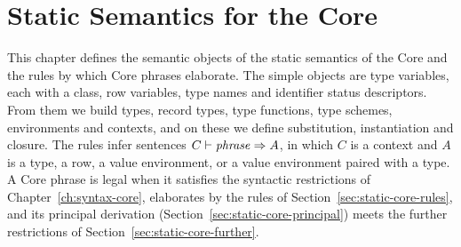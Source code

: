 
\chapter{Static Semantics for the Core}\label{ch:static-core}

This chapter defines the semantic objects of the static semantics of the Core
and the rules by which Core phrases elaborate. The simple objects are type
variables, each with a class, row variables, type names and identifier status
descriptors. From them we build types, record types, type functions, type
schemes, environments and contexts, and on these we define substitution,
instantiation and closure. The rules infer sentences $C \vdash \mathit{phrase} \Rightarrow A$,
in which $C$ is a context and $A$ is a type, a row, a value environment, or a
value environment paired with a type. A Core phrase is legal when it satisfies
the syntactic restrictions of Chapter~\ref{ch:syntax-core}, elaborates by the
rules of Section~\ref{sec:static-core-rules}, and its principal derivation
(Section~\ref{sec:static-core-principal}) meets the further restrictions of
Section~\ref{sec:static-core-further}. %

